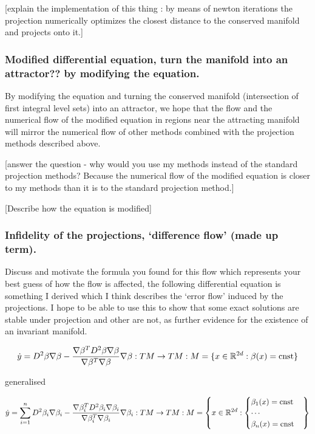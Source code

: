 \documentclass[12pt]{article}
\begin{document}
[explain the implementation of this thing : by means of newton iterations the projection numerically optimizes the closest distance to the conserved manifold and projects onto it.] 


\subsubsection{Modified differential equation, turn the manifold into an attractor?? by modifying the equation.}

By modifying the equation and turning the conserved manifold (intersection of first integral level sets) into an attractor, we hope that the flow and the numerical flow of the modified equation in regions near the attracting manifold will mirror the numerical flow of other methods combined with the projection methods described above. 

[answer the question - why would you use my methods instead of the standard projection methods? Because the numerical flow of the modified equation is closer to my methods than it is to the standard projection method.]

[Describe how the equation is modified]

\subsubsection{Infidelity of the projections, `difference flow' (made up term).}

Discuss and motivate the formula you found for this flow which represents your best guess of how the flow is affected, the following differential equation is something I derived which I think describes the `error flow' induced by the projections. I hope to be able to use this to show that some exact solutions are stable under projection and other are not, as further evidence for the existence of an invariant manifold. 

\begin{equation}\label{eq:differnece flow}
\dot y = D^2\beta \nabla\beta - \frac{\nabla\beta^T D^2\beta \nabla\beta}{\nabla\beta^T\nabla\beta} \nabla\beta : TM\to TM : M = \{x\in\mathbb{R}^{2d} : \beta(x) = \text{cnst} \}
\end{equation}

generalised

\begin{equation}\label{eq:difference flow many}
\dot y = \sum_{i=1}^n D^2\beta_i \nabla\beta_i - \frac{\nabla\beta_i^T D^2\beta_i\nabla\beta_i}{\nabla\beta_i^T\nabla\beta_i} \nabla\beta_i : TM\to TM : M = \left\{x\in\mathbb{R}^{2d} : \begin{cases}\beta_1(x)=\text{cnst}\\\cdots\\\beta_n(x)=\text{cnst}\end{cases}\right\}
\end{equation}
\end{document}

